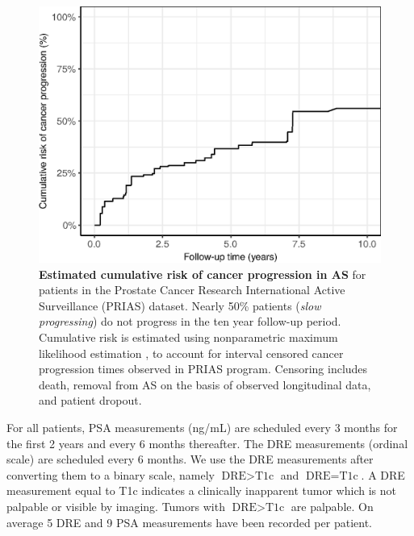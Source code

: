 \begin{figure}[!htb]
\captionsetup{justification=justified}
\centerline{\includegraphics[width=\columnwidth]{images/npmle_plot.eps}}
\caption{\textbf{Estimated cumulative risk of cancer progression in AS} for patients in the Prostate Cancer Research International Active Surveillance (PRIAS) dataset. Nearly 50\% patients (\textit{slow progressing}) do not progress in the ten year follow-up period. Cumulative risk is estimated using nonparametric maximum likelihood estimation \citep{turnbull1976empirical}, to account for interval censored cancer progression times observed in PRIAS program. Censoring includes death, removal from AS on the basis of observed longitudinal data, and patient dropout.}
\label{fig:npmle_plot}
\end{figure}

For all patients, PSA measurements (ng/mL) are scheduled every 3 months for the first 2 years and every 6 months thereafter. The DRE measurements (ordinal scale) are scheduled every 6 months. We use the DRE measurements after converting them to a binary scale, namely $\mbox{DRE} > \mbox{T1c}$ and $\mbox{DRE} = \mbox{T1c}$. A DRE measurement equal to T1c\cite{schroder1992tnm} indicates a clinically inapparent tumor which is not palpable or visible by imaging. Tumors with $\mbox{DRE} > \mbox{T1c}$ are palpable. On average 5 DRE and 9 PSA measurements have been recorded per patient. 





